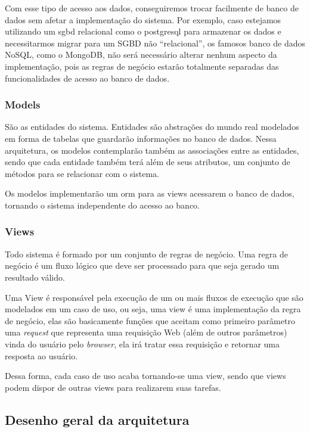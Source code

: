Com esse tipo de acesso aos dados, conseguiremos trocar facilmente de banco de 
dados sem afetar a implementação do sistema. Por exemplo, caso estejamos 
utilizando um \gls{sgbd} relacional como o postgresql para armazenar os dados e 
necessitarmos migrar para um SGBD não “relacional”, os famosos banco de dados 
NoSQL, como o MongoDB, não será necessário alterar nenhum aspecto da 
implementação, pois as regras de negócio estarão totalmente separadas das 
funcionalidades de acesso ao banco de dados.

\subsubsection{Models}
São as entidades do sistema. Entidades são abstrações do mundo real modelados em 
forma de tabelas que guardarão informações no banco de dados. Nessa arquitetura, 
os modelos contemplarão também as associações entre as entidades, sendo que cada 
entidade também terá al\'em de seus atributos, um conjunto de métodos para se 
relacionar com o sistema.

Os modelos implementarão um \gls{orm} para as views 
acessarem o banco de dados, tornando o sistema independente do acesso ao banco. 

\subsubsection{Views}
Todo sistema é formado por um conjunto de regras de negócio. Uma regra de 
neg\'ocio é um fluxo lógico que deve ser processado para que seja gerado um resultado 
válido.

Uma View é responsável pela execução de um ou mais fluxos de execução que são 
modelados em um caso de uso, ou seja, uma view é uma implementação da regra de 
neg\'ocio, elas são basicamente funções que aceitam como primeiro parâmetro uma 
\textit{request} que representa uma requisição Web (além de outros parâmetros) 
vinda do usuário pelo \textit{browser}, ela irá tratar essa requisição e 
retornar uma resposta ao usuário.

Dessa forma, cada caso de uso acaba tornando-se uma view, sendo que views podem 
dispor de outras views para realizarem suas tarefas. 

\subsection{Desenho geral da arquitetura}

